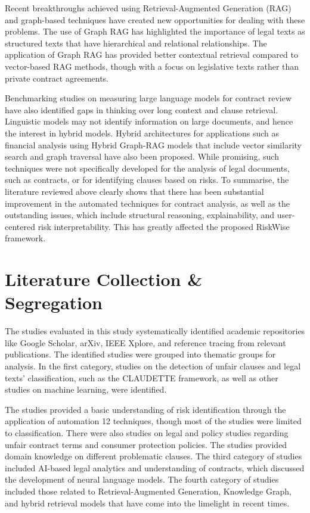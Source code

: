 Recent breakthroughs achieved using Retrieval-Augmented Generation 
(RAG) and graph-based techniques have created new 
opportunities for dealing with these problems.
The use of Graph RAG has highlighted the importance of legal 
texts as structured texts that have hierarchical and relational relationships.
The application of Graph RAG has provided better contextual 
retrieval compared to vector-based RAG methods,
though with a focus on legislative texts rather than private contract
agreements.

Benchmarking studies on measuring large language models for contract
review have also identified gaps in thinking over long context and clause
retrieval. Linguistic models may not identify information on large documents,
and hence the interest in hybrid models. Hybrid
architectures for applications such as financial analysis using Hybrid
Graph-RAG models that include vector similarity
search and graph traversal have also been proposed.
While promising, such techniques were not specifically developed for the analysis of legal documents, 
such as contracts, or for identifying clauses based on risks. 
To summarise, the literature reviewed above clearly shows that 
there has been substantial improvement in the automated techniques 
for contract analysis, as well as the outstanding issues, which include 
structural reasoning, explainability, and user-centered risk interpretability. 
This has greatly affected the proposed RiskWise framework.

\section{Literature Collection \& Segregation}
The studies evaluated in this study systematically identified
academic repositories like Google Scholar, arXiv, IEEE Xplore, and
reference tracing from relevant publications. 
The identified studies were grouped into thematic groups for analysis.
In the first category, studies on the detection of unfair clauses and 
legal texts' classification, such as the
CLAUDETTE framework, as well as other studies on machine learning, 
were identified.

The studies provided a basic understanding of risk identification 
through the application of automation 12
techniques, though most of the studies were limited to classification.
There were also studies on legal and policy studies regarding unfair 
contract terms and consumer protection policies.
The studies provided domain knowledge on different problematic clauses.
The third category of studies included AI-based legal analytics and 
understanding of contracts, which discussed the development of neural language models.
The fourth category of studies included those related to 
Retrieval-Augmented Generation, Knowledge Graph,
and hybrid retrieval models that have come into the limelight in recent times.

